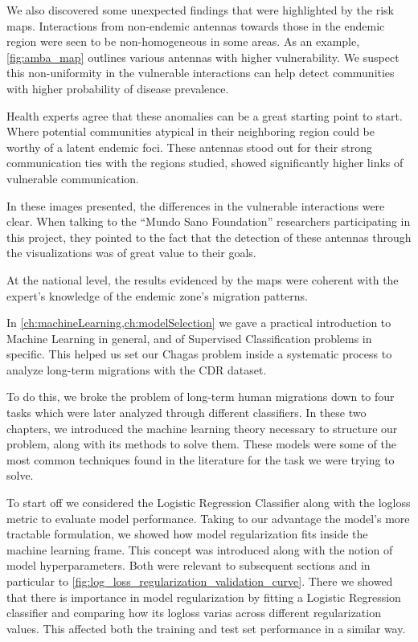 We also discovered some unexpected findings that were highlighted by the risk maps.
Interactions from non-endemic antennas towards those in the endemic region were seen to be non-homogeneous in some areas.
As an example, \cref{fig:amba_map} outlines various antennas with higher vulnerability.
We suspect this non-uniformity in the vulnerable interactions can help detect communities with higher probability of disease prevalence.

Health experts agree that these anomalies can be a great starting point to start.
Where potential communities atypical in their neighboring region could be worthy of a latent endemic foci.
These antennas stood out for their strong communication ties with the regions studied, showed significantly higher links of vulnerable communication.

In these images presented, the differences in the vulnerable interactions were clear.
When talking to the ``Mundo Sano Foundation'' researchers participating in this project, they pointed to the fact that the detection of these antennas through the visualizations was of great value to their goals.


At the national level, the results evidenced by the maps were coherent with the expert's knowledge of the endemic zone's migration patterns.



In \cref{ch:machineLearning,ch:modelSelection} we gave a practical introduction to Machine Learning in general, and of Supervised Classification problems in specific.
This helped us set our Chagas problem inside a systematic process to analyze long-term migrations with the CDR dataset.

To do this, we broke the problem of long-term human migrations down to four tasks which were later analyzed through different classifiers.
In these two chapters, we introduced the machine learning theory necessary to structure our problem, along with its methods to solve them.
These models were some of the most common techniques found in the literature for the task we were trying to solve.

To start off we considered the Logistic Regression Classifier along with the logloss metric to evaluate model performance.
Taking to our advantage the model's more tractable formulation, we showed how model regularization fits inside the machine learning frame.
This concept was introduced along with the notion of model hyperparameters.
Both were relevant to subsequent sections and in particular to \cref{fig:log_loss_regularization_validation_curve}.
There we showed that there is importance in model regularization by fitting a Logistic Regression classifier and comparing how its logloss varias across different regularization values.
This affected both the training and test set performance in a similar way.


